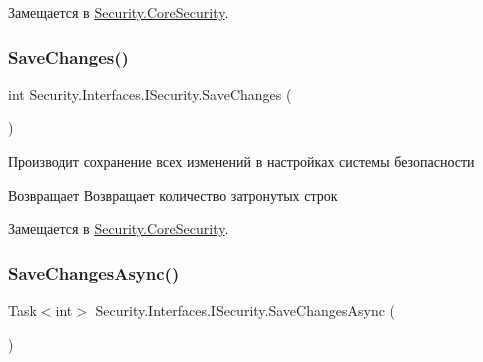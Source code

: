 Замещается в \hyperlink{class_security_1_1_core_security_a87672cfd35522b393c3139daa4960258}{Security.\+Core\+Security}.

\mbox{\label{interface_security_1_1_interfaces_1_1_i_security_ac2cb6f1d06c0684886c94ed6ed88e7da}} 
\subsubsection{\texorpdfstring{Save\+Changes()}{SaveChanges()}}
{\footnotesize\ttfamily int Security.\+Interfaces.\+I\+Security.\+Save\+Changes (\begin{DoxyParamCaption}{ }\end{DoxyParamCaption})}



Производит сохранение всех изменений в настройках системы безопасности 

\begin{DoxyReturn}{Возвращает}
Возвращает количество затронутых строк
\end{DoxyReturn}


Замещается в \hyperlink{class_security_1_1_core_security_a85c19dc69e9698e6d6df724721ae5795}{Security.\+Core\+Security}.

\mbox{\label{interface_security_1_1_interfaces_1_1_i_security_a73465b9b858b22e2ec8497f903c8f49b}} 
\subsubsection{\texorpdfstring{Save\+Changes\+Async()}{SaveChangesAsync()}}
{\footnotesize\ttfamily Task$<$int$>$ Security.\+Interfaces.\+I\+Security.\+Save\+Changes\+Async (\begin{DoxyParamCaption}{ }\end{DoxyParamCaption})}



